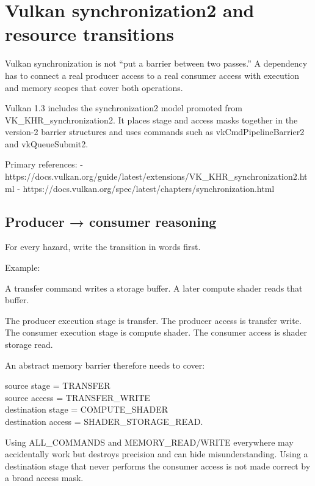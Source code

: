 \hypertarget{appendix-f15ce0d9c170}{}\label{referencestart:appendix-f15ce0d9c170}
\section{Vulkan synchronization2 and resource transitions}\label{appendix-f15ce0d9c170-vulkan-synchronization2-and-resource-transitions}

Vulkan synchronization is not ``put a barrier between two passes.'' A dependency has to connect a real producer access to a real consumer access with execution and memory scopes that cover both operations.

Vulkan 1.3 includes the synchronization2 model promoted from VK\_KHR\_synchronization2. It places stage and access masks together in the version-2 barrier structures and uses commands such as vkCmdPipelineBarrier2 and vkQueueSubmit2.

Primary references: - https://docs.vulkan.org/guide/latest/extensions/VK\_KHR\_synchronization2.html - https://docs.vulkan.org/spec/latest/chapters/synchronization.html

\subsection{Producer → consumer reasoning}\label{appendix-f15ce0d9c170-producer-consumer-reasoning}

For every hazard, write the transition in words first.

Example:

A transfer command writes a storage buffer. A later compute shader reads that buffer.

The producer execution stage is transfer. The producer access is transfer write. The consumer execution stage is compute shader. The consumer access is shader storage read.

An abstract memory barrier therefore needs to cover:

source stage = TRANSFER\\
source access = TRANSFER\_WRITE\\
destination stage = COMPUTE\_SHADER\\
destination access = SHADER\_STORAGE\_READ.

Using ALL\_COMMANDS and MEMORY\_READ/WRITE everywhere may accidentally work but destroys precision and can hide misunderstanding. Using a destination stage that never performs the consumer access is not made correct by a broad access mask.

